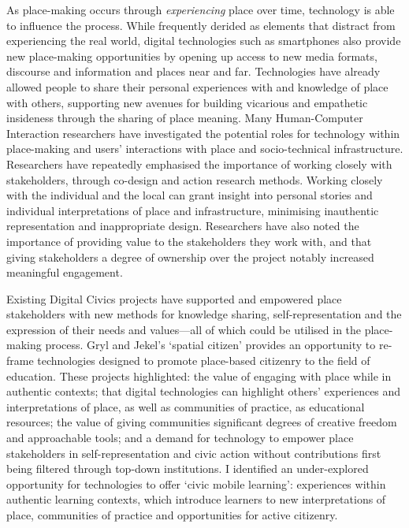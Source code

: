 As place-making occurs through \textit{experiencing} place over time, technology is able to influence the process. While frequently derided as elements that distract from experiencing the real world, digital technologies such as smartphones also provide new place-making opportunities by opening up access to new media formats, discourse and information and places near and far. Technologies have already allowed people to share their personal experiences with and knowledge of place with others, supporting new avenues for building vicarious and empathetic insideness through the sharing of place meaning. Many Human-Computer Interaction researchers have investigated the potential roles for technology within place-making and users' interactions with place and socio-technical infrastructure. Researchers have repeatedly emphasised the importance of working closely with stakeholders, through co-design and action research methods. Working closely with the individual and the local can grant insight into personal stories and individual interpretations of place and infrastructure, minimising inauthentic representation and inappropriate design. Researchers have also noted the importance of providing value to the stakeholders they work with, and that giving stakeholders a degree of ownership over the project notably increased meaningful engagement.

Existing Digital Civics projects have supported and empowered place stakeholders with new methods for knowledge sharing, self-representation and the expression of their needs and values---all of which could be utilised in the place-making process. Gryl and Jekel's `spatial citizen' provides an opportunity to re-frame technologies designed to promote place-based citizenry to the field of education. These projects highlighted: the value of engaging with place while in authentic contexts; that digital technologies can highlight others’ experiences and interpretations of place, as well as communities of practice, as educational resources; the value of giving communities significant degrees of creative freedom and approachable tools; and a demand for technology to empower place stakeholders in self-representation and civic action without contributions first being filtered through top-down institutions. I identified an under-explored opportunity for technologies to offer `civic mobile learning': experiences within authentic learning contexts, which introduce learners to new interpretations of place, communities of practice and opportunities for active citizenry.